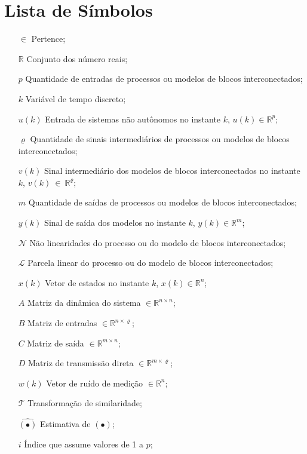\chapter*{Lista de Símbolos}
\thispagestyle{empty}


\begin{itemize}[leftmargin=30pt,labelsep=1em,align=left]
	\setlength\itemsep{0em}
	\item[$\in$] Pertence;
	\item[$\mathbb{R}$] Conjunto dos número reais;
	\item[$p$] Quantidade de entradas de processos ou modelos de blocos interconectados;
	\item[$k$] Variável de tempo discreto;
	\item[$u(k)$] Entrada de sistemas não autônomos no instante $k$, $u(k) \in \mathds{R}^{p}$;
	\item[$\varrho$] Quantidade de sinais intermediários de processos ou modelos de blocos interconectados;
	\item[${v}(k)$] Sinal intermediário dos modelos de blocos interconectados no instante $k$, $v(k)~\in~\mathds{R}^{\varrho}$;
	\item[$m$] Quantidade de saídas de processos ou modelos de blocos interconectados;
	\item[$y(k)$] Sinal de saída dos modelos no instante $k$, $y(k)  \in \mathds{R}^{m}$;
	\item[$\mathcal{N}$] Não linearidades do processo ou do modelo de blocos interconectados;
	\item[$\mathcal{L}$] Parcela linear do processo ou do modelo de blocos interconectados;
	\item[$x(k)$] Vetor de estados no instante $k$, $x(k)  \in \mathds{R}^{n}$;
	\item[$A$] Matriz da dinâmica do sistema $ \in \mathds{R}^{n \times n}$;
	\item[$B$] Matriz de entradas $ \in \mathds{R}^{n \times \varrho}$;
	\item[$C$] Matriz de saída $ \in \mathds{R}^{m \times n}$;
	\item[$D$] Matriz de transmissão direta $ \in \mathds{R}^{m \times \varrho}$;
	\item[$w(k)$] Vetor de ruído de medição $ \in \mathds{R}^{n}$;
	\item[$\mathcal{T}$] Transformação de similaridade;
	\item[$\hat{(\bullet)}$] Estimativa de $(\bullet)$;
	\item[$i$] Índice que assume valores de 1 a $p$;

\end{itemize}
